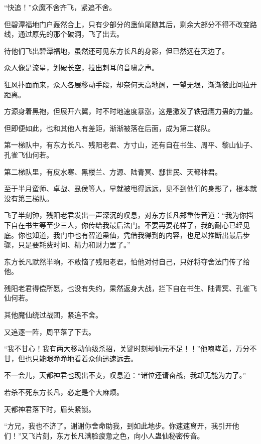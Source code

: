 
\begin{this_body}

“快追！”众魔不舍齐飞，紧追不舍。

但碧潭福地门户轰然合上，只有少部分的蛊仙尾随其后，剩余大部分不得不改变路线，通过原先的那个破洞，飞了出去。

待他们飞出碧潭福地，虽然还可见东方长凡的身影，但已然远在天边了。

众人像是流星，划破长空，拉出刺耳的音啸之声。

狂风扑面而来，众人各展移动手段，却奈何天高地阔，一望无垠，渐渐彼此间拉开距离。

方源身着黑袍，但展开六翼，时不时地速度暴涨，这是激发了铁冠鹰力蛊的力量。

但即便如此，也和其他人有差距，渐渐被落在后面，成为第二梯队。

第一梯队中，有东方长凡、残阳老君、方寸山，还有自在书生、周平、黎山仙子、孔雀飞仙何若。

第二梯队里，有皮水寒、黑楼兰、方源、陆青冥、郄世民、天都神君。

至于半月蛮师、卓战、虱侯等人，早就被甩得远远，见不到他们的身影了，根本就没有第三梯队。

飞了半刻钟，残阳老君发出一声深沉的叹息，对东方长凡郑重传音道：“我为你挡下自在书生等至少三人，你传给我最后法门。不要再耍花样了，我的耐心已经见底。你也知道，我门中也有智道蛊仙，凭借我得到的内容，也足以推断出最后步骤，只是要耗费时间、精力和财力罢了。”

东方长凡默然半晌，不敢恼了残阳老君，怕他对付自己，只好将夺舍法门传了给他。

残阳老君得偿所愿，也没有失约，果然返身大战，拦下自在书生、陆青冥、孔雀飞仙何若。

其他魔仙绕过战团，紧追不舍。

又追逐一阵，周平落了下去。

“我不甘心！我有两大移动仙级杀招，关键时刻却仙元不足！！”他咆哮着，万分不甘，但也只能眼睁睁地看着众仙迅速远去。

不一会儿，天都神君也现出不支，叹息道：“诸位还请奋战，我却无能为力了。”

若杀不死东方长凡，必定是个大麻烦。

天都神君落下时，眉头紧锁。

“方兄，我也不济了。谢谢你舍命助我，到如此地步。你速速离开，我引开他们！”又飞片刻，东方长凡满脸疲惫之色，向小人蛊仙秘密传音。


\end{this_body}
